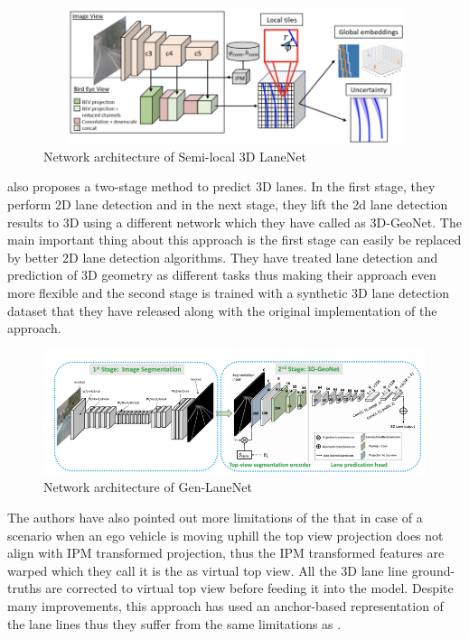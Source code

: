  \begin{figure}[h]
    \centering
    \includegraphics[width=12cm, height=4cm]{images/3DLaneNET++.png}
    \caption{Network architecture of Semi-local 3D LaneNet \cite{DBLP:journals/corr/abs-2011-01535}}
    \end{figure}

\cite{guo2020gen} also proposes a two-stage method to predict 3D lanes. In the first stage, they perform 2D lane detection and in the next stage, they lift the 2d lane detection results to 3D using a different network which they have called as 3D-GeoNet. The main important thing about this approach is the first stage can easily be replaced by better 2D lane detection algorithms. They have treated lane detection and prediction of 3D geometry as different tasks thus making their approach even more flexible and the second stage is trained with a synthetic 3D lane detection dataset that they have released along with the original implementation of the approach. 

 \begin{figure}[h]
    \centering
    \includegraphics[width=\textwidth]{images/GenLaneNET.png}
    \caption{Network architecture of Gen-LaneNet \cite{guo2020gen}}
    \end{figure}

The authors have also pointed out more limitations of the \cite{DBLP:journals/corr/abs-1811-10203} that in case of a scenario when an ego vehicle is moving uphill the top view projection does not align with IPM transformed projection, thus the IPM transformed features are warped which they call it is the as virtual top view. All the 3D lane line ground-truths are corrected to virtual top view before feeding it into the model. Despite many improvements, this approach has used an anchor-based representation of the lane lines thus they suffer from the same limitations as \cite{DBLP:journals/corr/abs-1811-10203}. 

